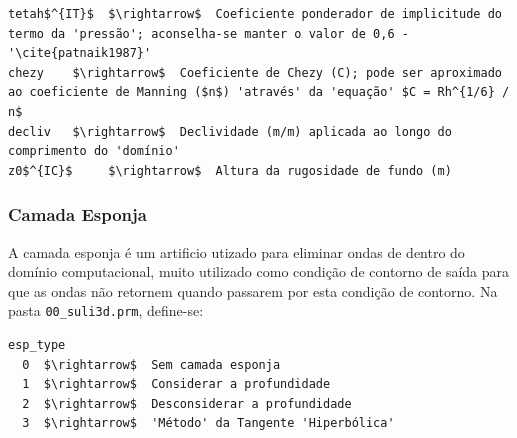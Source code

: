 \documentclass[12pt, a4paper]{article}
\newcommand{\SLIC}{{\bf SuLi-IC}}
\begin{document}
\begin{lstlisting}[escapeinside=''] 
tetah$^{IT}$  $\rightarrow$  Coeficiente ponderador de implicitude do termo da 'pressão'; aconselha-se manter o valor de 0,6 - '\cite{patnaik1987}'
chezy    $\rightarrow$  Coeficiente de Chezy (C); pode ser aproximado ao coeficiente de Manning ($n$) 'através' da 'equação' $C = Rh^{1/6} / n$
decliv   $\rightarrow$  Declividade (m/m) aplicada ao longo do comprimento do 'domínio'
z0$^{IC}$     $\rightarrow$  Altura da rugosidade de fundo (m)
\end{lstlisting}





\subsubsection{Camada Esponja}

A camada esponja é um artificio utizado para eliminar ondas de dentro do domínio computacional, muito utilizado como condição de contorno de saída para que as ondas não retornem quando passarem por esta condição de contorno. Na pasta \verb|00_suli3d.prm|, define-se:

\begin{lstlisting}[escapeinside='']
esp_type
  0  $\rightarrow$  Sem camada esponja
  1  $\rightarrow$  Considerar a profundidade
  2  $\rightarrow$  Desconsiderar a profundidade
  3  $\rightarrow$  'Método' da Tangente 'Hiperbólica'
\end{lstlisting}	
\end{document}
